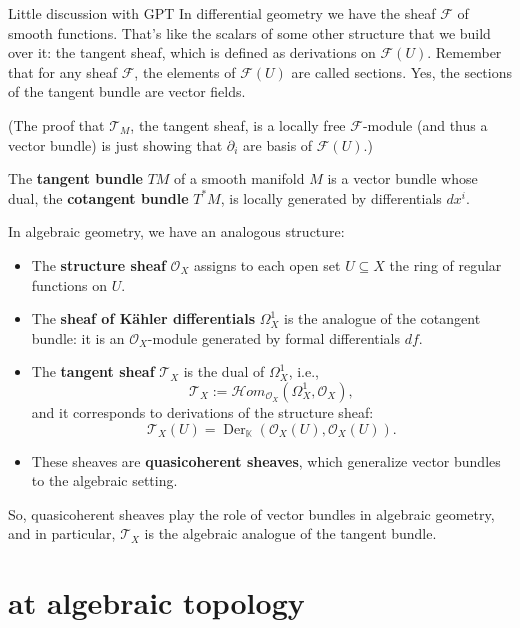 \begin{thing6}{Little discussion with GPT}\leavevmode
In differential geometry we have the sheaf \(\mathcal{F}\) of smooth functions. That's like the scalars of some other structure that we build over it: the tangent sheaf, which is defined as derivations on \(\mathcal{F}(U)\). Remember that for any sheaf \(\mathcal{F}\), the elements of \(\mathcal{F}(U)\) are called sections. Yes, the sections of the tangent bundle are vector fields.

(The proof that \(\mathcal{T}_M\), the tangent sheaf, is a locally free \(\mathcal{F}\)-module (and thus a vector bundle) is just showing that \(\partial_i\) are basis of \(\mathcal{F}(U)\).)

The \textbf{tangent bundle} $TM$ of a smooth manifold $M$ is a vector bundle whose dual, the \textbf{cotangent bundle} $T^*M$, is locally generated by differentials $dx^i$.

	In algebraic geometry, we have an analogous structure:

\begin{itemize}
  \item The \textbf{structure sheaf} $\mathcal{O}_X$ assigns to each open set $U \subseteq X$ the ring of regular functions on $U$.
  \item The \textbf{sheaf of Kähler differentials} $\Omega^1_X$ is the analogue of the cotangent bundle: it is an $\mathcal{O}_X$-module generated by formal differentials $df$.
  \item The \textbf{tangent sheaf} $\mathcal{T}_X$ is the dual of $\Omega^1_X$, i.e.,
  \[
  \mathcal{T}_X := \mathcal{H}om_{\mathcal{O}_X}(\Omega^1_X, \mathcal{O}_X),
  \]
  and it corresponds to derivations of the structure sheaf:
  \[
  \mathcal{T}_X(U) = \operatorname{Der}_{\mathbb{K}}(\mathcal{O}_X(U), \mathcal{O}_X(U)).
  \]
  \item These sheaves are \textbf{quasicoherent sheaves}, which generalize vector bundles to the algebraic setting.
\end{itemize}

So, quasicoherent sheaves play the role of vector bundles in algebraic geometry, and in particular, $\mathcal{T}_X$ is the algebraic analogue of the tangent bundle.
\end{thing6}

\chapter{at algebraic topology}

